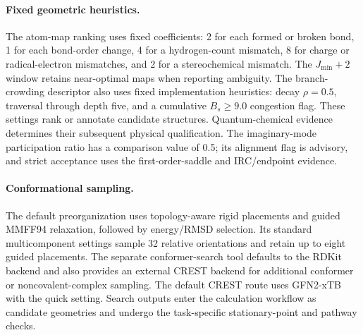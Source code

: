 \paragraph{Fixed geometric heuristics.}
The atom-map ranking uses fixed coefficients: 2 for each formed or broken bond, 1 for each bond-order change, 4 for a hydrogen-count mismatch, 8 for charge or radical-electron mismatches, and 2 for a stereochemical mismatch. The $J_{\min}+2$ window retains near-optimal maps when reporting ambiguity. The branch-crowding descriptor also uses fixed implementation heuristics: decay $\rho=0.5$, traversal through depth five, and a cumulative $B_s\geq9.0$ congestion flag. These settings rank or annotate candidate structures. Quantum-chemical evidence determines their subsequent physical qualification. The imaginary-mode participation ratio has a comparison value of 0.5; its alignment flag is advisory, and strict acceptance uses the first-order-saddle and IRC/endpoint evidence.

\paragraph{Conformational sampling.}
The default preorganization uses topology-aware rigid placements and guided MMFF94 relaxation, followed by energy/RMSD selection. Its standard multicomponent settings sample 32 relative orientations and retain up to eight guided placements. The separate conformer-search tool defaults to the RDKit backend and also provides an external CREST backend for additional conformer or noncovalent-complex sampling. The default CREST route uses GFN2-xTB with the quick setting. Search outputs enter the calculation workflow as candidate geometries and undergo the task-specific stationary-point and pathway checks.

